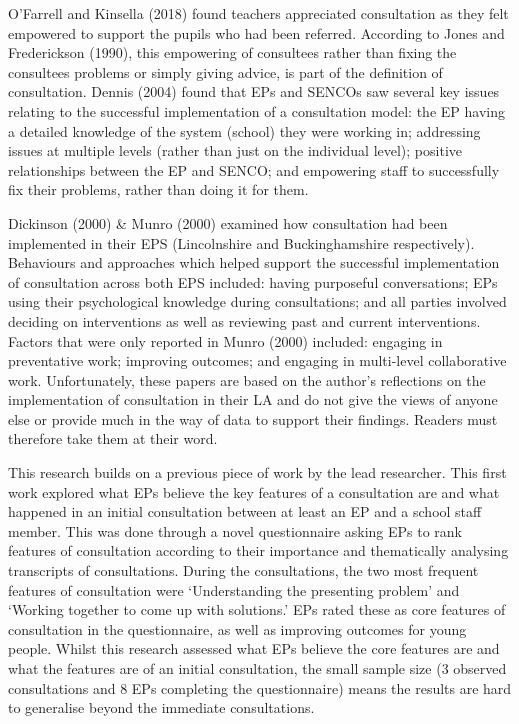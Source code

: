 \documentclass[
  english,
  man]{apa7}
\begin{document}
O'Farrell and Kinsella (2018) found teachers appreciated consultation as they felt empowered to support the pupils who had been referred. According to Jones and Frederickson (1990), this empowering of consultees rather than fixing the consultees problems or simply giving advice, is part of the definition of consultation. Dennis (2004) found that EPs and SENCOs saw several key issues relating to the successful implementation of a consultation model: the EP having a detailed knowledge of the system (school) they were working in; addressing issues at multiple levels (rather than just on the individual level); positive relationships between the EP and SENCO; and empowering staff to successfully fix their problems, rather than doing it for them.

Dickinson (2000) \& Munro (2000) examined how consultation had been implemented in their EPS (Lincolnshire and Buckinghamshire respectively). Behaviours and approaches which helped support the successful implementation of consultation across both EPS included: having purposeful conversations; EPs using their psychological knowledge during consultations; and all parties involved deciding on interventions as well as reviewing past and current interventions. Factors that were only reported in Munro (2000) included: engaging in preventative work; improving outcomes; and engaging in multi-level collaborative work. Unfortunately, these papers are based on the author's reflections on the implementation of consultation in their LA and do not give the views of anyone else or provide much in the way of data to support their findings. Readers must therefore take them at their word.

This research builds on a previous piece of work by the lead researcher. This first work explored what EPs believe the key features of a consultation are and what happened in an initial consultation between at least an EP and a school staff member. This was done through a novel questionnaire asking EPs to rank features of consultation according to their importance and thematically analysing transcripts of consultations. During the consultations, the two most frequent features of consultation were `Understanding the presenting problem' and `Working together to come up with solutions.' EPs rated these as core features of consultation in the questionnaire, as well as improving outcomes for young people. Whilst this research assessed what EPs believe the core features are and what the features are of an initial consultation, the small sample size (3 observed consultations and 8 EPs completing the questionnaire) means the results are hard to generalise beyond the immediate consultations.
\end{document}
